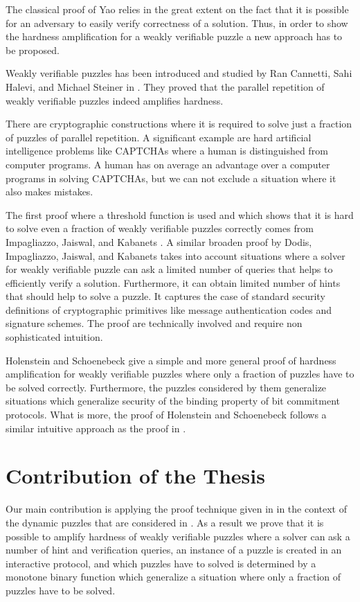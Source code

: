 \documentclass[11pt,a4paper,titlepage]{memoir}
\begin{document}
The classical proof of Yao \cite{Goldreich:2000:FCB:519078} relies in the great extent on the fact that
it is possible for an adversary to easily verify correctness of a solution.
Thus, in order to show the hardness amplification for a weakly verifiable puzzle a new approach has to be proposed.

Weakly verifiable puzzles has been introduced and studied by Ran Cannetti, Sahi Halevi, and Michael Steiner in \cite{canetti2004hardness}.
They proved that the parallel repetition of weakly verifiable puzzles indeed amplifies hardness.

There are cryptographic constructions where it is required to solve just a fraction of puzzles of parallel repetition.
A significant example are hard artificial intelligence problems like CAPTCHAs where a human is distinguished from computer programs.
A human has on average an advantage over a computer programs in solving CAPTCHAs, but we can not exclude a situation where it also makes mistakes.

The first proof where a threshold function is used and which shows that it is hard to solve even a fraction of weakly
verifiable puzzles correctly comes from Impagliazzo, Jaiswal, and Kabanets \cite{impagliazzo2007chernoff}.
A similar broaden proof by Dodis, Impagliazzo, Jaiswal, and Kabanets \cite{Dodis:2009:SAI:1530441.1530450}
takes into account situations where a solver for weakly verifiable puzzle can ask a limited number of queries
that helps to efficiently verify a solution. Furthermore, it can obtain limited number of hints that should help to solve a puzzle.
It captures the case of standard security definitions of cryptographic primitives like message authentication codes and signature schemes.
The proof \cite{impagliazzo2007chernoff, Dodis:2009:SAI:1530441.1530450} are technically involved and require non sophisticated intuition.

Holenstein and Schoenebeck \cite{DBLP:journals/corr/abs-1002-3534} give a simple and more general
proof of hardness amplification for weakly verifiable puzzles where only a fraction of puzzles have to be solved correctly.
Furthermore, the puzzles considered by them generalize situations which generalize security of the binding property of bit commitment protocols.
What is more, the proof of Holenstein and Schoenebeck follows a similar intuitive approach as the proof in \cite{canetti2004hardness}.

\section{Contribution of the Thesis}
Our main contribution is applying the proof technique given in \cite{DBLP:journals/corr/abs-1002-3534}
in the context of the dynamic puzzles that are considered in \cite{Dodis:2009:SAI:1530441.1530450}.
As a result we prove that it is possible to amplify hardness of weakly verifiable puzzles where a solver
can ask a number of hint and verification queries, an instance of a puzzle is created in an interactive protocol, and
which puzzles have to solved is determined by a monotone binary function which generalize a situation where only
a fraction of puzzles have to be solved.
\end{document}
